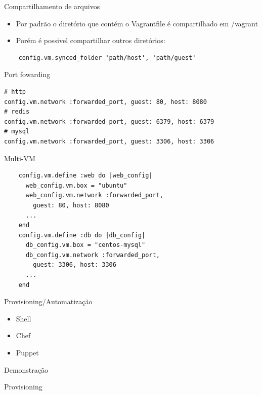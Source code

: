 \documentclass{beamer}
\begin{document}
\begin{frame}[fragile]{Compartilhamento de arquivos}
  \begin{itemize}
    \item Por padrão o diretório que contém o Vagrantfile é compartilhado em /vagrant
    \item Porém é possivel compartilhar outros diretórios:
  \end{itemize}
  \begin{verbatim}
    config.vm.synced_folder 'path/host', 'path/guest'
  \end{verbatim}
\end{frame}

\begin{frame}[fragile]{Port fowarding}
  \begin{verbatim}
# http
config.vm.network :forwarded_port, guest: 80, host: 8080
# redis
config.vm.network :forwarded_port, guest: 6379, host: 6379
# mysql
config.vm.network :forwarded_port, guest: 3306, host: 3306
  \end{verbatim}
\end{frame}

\begin{frame}[fragile]{Multi-VM}
  \begin{verbatim}
    config.vm.define :web do |web_config|
      web_config.vm.box = "ubuntu"
      web_config.vm.network :forwarded_port,
        guest: 80, host: 8080
      ...
    end
    config.vm.define :db do |db_config|
      db_config.vm.box = "centos-mysql"
      db_config.vm.network :forwarded_port,
        guest: 3306, host: 3306
      ...
    end
  \end{verbatim}
\end{frame}

\begin{frame}{Provisioning/Automatização}
  \begin{itemize}
    \item Shell
    \item Chef
    \item Puppet
  \end{itemize}
\end{frame}

\begin{frame}[plain,c]
  \begin{center}
    \Huge Demonstração
  \end{center}
  \begin{center}
    Provisioning
  \end{center}
\end{frame}
\end{document}
